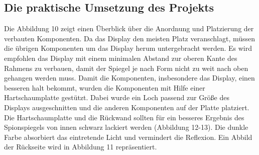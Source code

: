 \subsection{Die praktische Umsetzung des Projekts}
Die Abbildung 10 zeigt einen Überblick über die Anordnung und Platzierung der verbauten Komponenten. Da das Display den meisten Platz veranschlagt, müssen die übrigen Komponenten um das Display herum untergebracht werden. Es wird empfohlen das Display mit einem minimalen Abstand zur oberen Kante des Rahmens zu verbauen, damit der Spiegel je nach Form nicht zu weit nach oben gehangen werden muss. Damit die Komponenten, insbesondere das Display, einen besseren halt bekommt, wurden die Komponenten mit Hilfe einer Hartschaumplatte gestützt. Dabei wurde ein Loch passend zur Größe des Displays ausgeschnitten und die anderen Komponenten auf der Platte platziert. Die Hartschaumplatte und die Rückwand sollten für ein besseres Ergebnis des Spionspiegels von innen schwarz lackiert werden (Abbildung 12-13). Die dunkle Farbe absorbiert das eintretende Licht und vermindert die Reflexion. Ein Abbild der Rückseite wird in Abbildung 11 repräsentiert.

